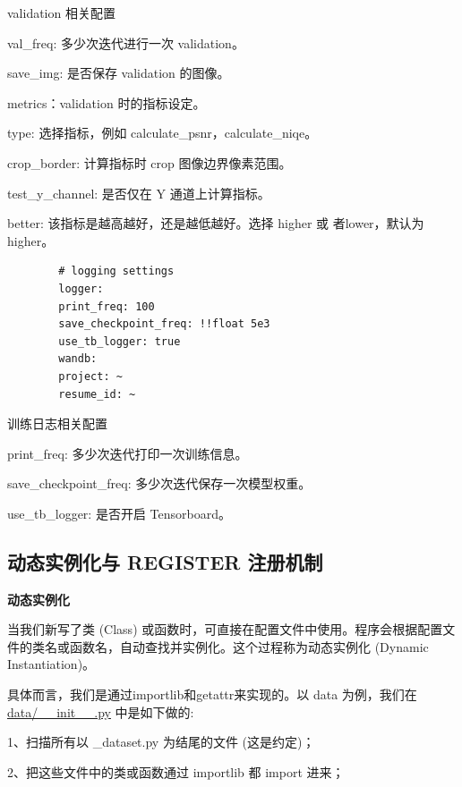 \documentclass[../main.tex]{subfiles}
\begin{document}
	\begin{exampleBox}[righthand ratio=0.00, sidebyside, sidebyside align=center, lower separated=false]{validation 相关配置}
		
		val\_freq: 多少次迭代进行一次 validation。
		
		save\_img: 是否保存 validation 的图像。
		
		metrics：validation 时的指标设定。
		
		type: 选择指标，例如 calculate\_psnr，calculate\_niqe。
		
		crop\_border: 计算指标时 crop 图像边界像素范围。
		
		test\_y\_channel: 是否仅在 Y 通道上计算指标。
		
		better: 该指标是越高越好，还是越低越好。选择 higher 或 者lower，默认为 higher。
	\end{exampleBox}
	\begin{verbatim}
		# logging settings
		logger:
		print_freq: 100
		save_checkpoint_freq: !!float 5e3
		use_tb_logger: true
		wandb:
		project: ~
		resume_id: ~
	\end{verbatim}
	\begin{exampleBox}[righthand ratio=0.00, sidebyside, sidebyside align=center, lower separated=false]{训练日志相关配置}
		
		print\_freq: 多少次迭代打印一次训练信息。
		
		save\_checkpoint\_freq: 多少次迭代保存一次模型权重。
		
		use\_tb\_logger: 是否开启 Tensorboard。
	\end{exampleBox}
	
	\subsection{动态实例化与 REGISTER 注册机制}
	\textbf{动态实例化}
	
	当我们新写了类 (Class) 或函数时，可直接在配置文件中使用。程序会根据配置文件的类名或函数名，自动查找并实例化。这个过程称为动态实例化 (Dynamic Instantiation)。
	
	具体而言，我们是通过importlib和getattr来实现的。以 data 为例，我们在 \href{https://github.com/XPixelGroup/BasicSR/blob/master/basicsr/data/__init__.py}{data/\_\_init\_\_.py} 中是如下做的:
	
	1、扫描所有以 \_dataset.py 为结尾的文件 (这是约定)；
	
	2、把这些文件中的类或函数通过 importlib 都 import 进来；
	
\end{document}
